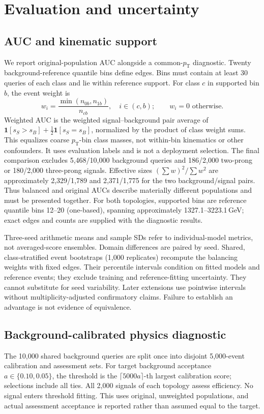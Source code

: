 \documentclass[11pt,a4paper]{article}
\newcommand{\pt}{p_{\mathrm T}}
\begin{document}
\section{Evaluation and uncertainty}
\subsection{AUC and kinematic support}
We report original-population AUC alongside a common-$\pt$ diagnostic. Twenty
background-reference quantile bins define edges. Bins must contain at least 30
queries of each class and lie within reference support. For class $c$ in supported
bin $b$, the event weight is
\begin{equation}
 w_i=\frac{\min(n_{0b},n_{1b})}{n_{cb}},\quad i\in(c,b);
 \qquad w_i=0\text{ otherwise}.
\end{equation}
Weighted AUC is the weighted signal--background pair average of
$\mathbf 1[s_S>s_B]+\tfrac12\mathbf 1[s_S=s_B]$, normalized by the product of
class weight sums. This equalizes coarse $\pt$-bin class masses, not within-bin
kinematics or other confounders. It uses evaluation labels and is not a deployment
selection. The final comparison excludes 5,468/10,000 background queries and
186/2,000 two-prong or 180/2,000 three-prong signals. Effective sizes
$(\sum w)^2/\sum w^2$ are approximately 2,329/1,789 and 2,371/1,775 for the two
background/signal pairs. Thus balanced and original AUCs describe materially
different populations and must be presented together.
For both topologies, supported bins are reference quantile bins 12--20
(one-based), spanning approximately 1327.1--3223.1\,GeV; exact edges and counts
are supplied with the diagnostic results.

Three-seed arithmetic means and sample SDs refer to individual-model metrics,
not averaged-score ensembles. Domain differences are paired by seed. Shared,
class-stratified event bootstraps (1,000 replicates) recompute the balancing
weights with fixed edges. Their percentile intervals condition on fitted models
and reference events; they exclude training and reference-fitting uncertainty.
They cannot substitute for seed variability. Later extensions use pointwise
intervals without multiplicity-adjusted confirmatory claims. Failure to establish
an advantage is not evidence of equivalence.

\subsection{Background-calibrated physics diagnostic}
The 10,000 shared background queries are split once into disjoint 5,000-event
calibration and assessment sets. For target background acceptance $a\in\{0.10,0.05\}$,
the threshold is the $\lceil5000a\rceil$-th largest calibration score; selections
include all ties. All 2,000 signals of each topology assess efficiency. No signal
enters threshold fitting. This uses original, unweighted populations, and actual
assessment acceptance is reported rather than assumed equal to the target.
\end{document}
